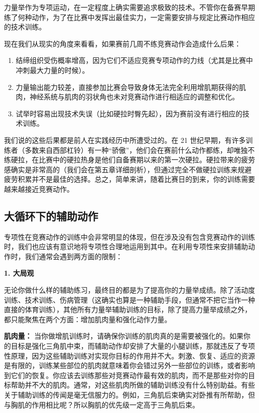 \documentclass[fontset=fandol, a4paper, 12pt, openright]{ctexbook}
\begin{document}
力量举作为专项运动，在一定程度上确实需要追求极致的技术。不管你在备赛早期练了何种动作，为了在比赛中发挥出最佳实力，一定需要安排与规定比赛动作相应的技术训练。

现在我们从现实的角度来看看，如果赛前几周不练竞赛动作会造成什么后果：
\begin{enumerate}
    \item 结缔组织受伤概率增高，因为它们不适应竞赛专项动作的力线（尤其是比赛中冲刺最大力量的时候）。
    \item 力量输出能力较差，直接参加比赛会导致身体无法完全利用增肌期获得的肌肉，神经系统与肌肉的羽状角也未对竞赛动作进行相适应的调整和优化。
    \item 试举时容易出现技术失误（比如硬拉时臀先起），因为赛前没有进行相应的技术训练。
\end{enumerate}

我们说的这些后果都是前人在实践经历中所遭受过的。在 21 世纪早期，有许多训练者（多数来自西部杠铃）有一种“骄傲”，他们会在赛前什么动作都练，却唯独不练硬拉，在比赛中的硬拉热身是他们自备赛期以来的第一次硬拉。硬拉带来的疲劳感确实是非常高的（我们会在第五章详细剖析），但通过完全不做硬拉训练来规避疲劳积累并不是最佳的选择。总之，简单来讲，随着比赛日的到来，你的训练需要越来越接近竞赛动作。

\subsection{大循环下的辅助动作}

专项性在竞赛动作的训练中会非常明显的体现，但在涉及没有包含竞赛动作的训练时，我们也应该有意识地将专项性合理地运用到其中。在利用专项性来安排辅助动作时，我们通常会遇到两方面的限制：

\textbf{1. 大局观}

无论你做什么样的辅助练习，最终目的都是为了提高你的力量举成绩。除了活动度训练、技术训练、伤病管理（这确实也算是一种辅助手段，但通常不把它当作一种直接的体育训练），其他所有力量举辅助训练的目标，除了提高力量举成绩之外，都只能聚焦在两个方面：增加肌肉量和强化动作力量。

\textbf{肌肉量：} 当你做增肌训练时，请确保你训练的肌肉真的是需要被强化的。如果你的目标是强化三角肌中束，而辅助动作却安排了大量的小腿训练，那就违反了专项性原理，因为这些辅助训练对实现你目标的作用并不大。刺激、恢复、适应的资源是有限的，训练某些部位的肌肉就意味着你会错过另外一些部位的训练，或者影响到它们的恢复。你应该去训练那些对竞赛动作最有效的肌肉，而不是那些对你的目标帮助并不大的肌肉。通常，对这些肌肉所做的辅助训练没有什么特别助益。有些关于辅助训练的传闻是毫无信服力的。例如，三角肌后束确实对卧推有所帮助，但与胸肌的作用相比呢？所以胸肌的优先级一定高于三角肌后束。
\end{document}
